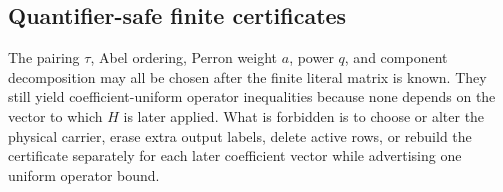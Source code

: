 \subsection{Quantifier-safe finite certificates}

The pairing \(\tau\), Abel ordering, Perron weight \(a\), power \(q\), and
component decomposition may all be chosen after the finite literal matrix
is known.  They still yield coefficient-uniform operator inequalities
because none depends on the vector to which \(H\) is later applied.  What
is forbidden is to choose or alter the physical carrier, erase extra
output labels, delete active rows, or rebuild the certificate separately
for each later coefficient vector while advertising one uniform operator
bound.
